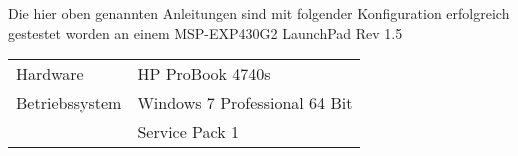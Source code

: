 Die hier oben genannten Anleitungen sind mit folgender Konfiguration
erfolgreich gestestet worden an einem MSP-EXP430G2 LaunchPad Rev 1.5

\begin{table}[h!]
\centering
\begin{tabular}{ l l }
Hardware        & HP ProBook 4740s \\
Betriebssystem  & Windows 7 Professional 64 Bit \\
                & Service Pack 1 \\
\end{tabular}
\end{table}

